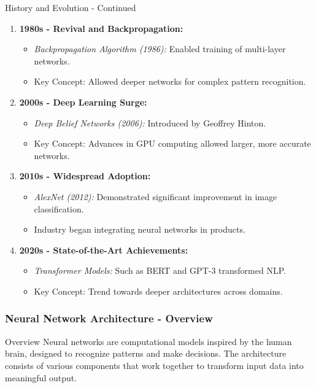 \documentclass[aspectratio=169]{beamer}
\begin{document}
\begin{frame}[fragile]{History and Evolution - Continued}
    \begin{enumerate}[resume]
        \item \textbf{1980s - Revival and Backpropagation:}
            \begin{itemize}
                \item \textit{Backpropagation Algorithm (1986):} Enabled training of multi-layer networks.
                \item Key Concept: Allowed deeper networks for complex pattern recognition.
            \end{itemize}
        
        \item \textbf{2000s - Deep Learning Surge:}
            \begin{itemize}
                \item \textit{Deep Belief Networks (2006):} Introduced by Geoffrey Hinton.
                \item Key Concept: Advances in GPU computing allowed larger, more accurate networks.
            \end{itemize}
        
        \item \textbf{2010s - Widespread Adoption:}
            \begin{itemize}
                \item \textit{AlexNet (2012):} Demonstrated significant improvement in image classification.
                \item Industry began integrating neural networks in products.
            \end{itemize}

        \item \textbf{2020s - State-of-the-Art Achievements:}
            \begin{itemize}
                \item \textit{Transformer Models:} Such as BERT and GPT-3 transformed NLP.
                \item Key Concept: Trend towards deeper architectures across domains.
            \end{itemize}
    \end{enumerate}
\end{frame}

\begin{frame}[fragile]
    \frametitle{Neural Network Architecture - Overview}
    \begin{block}{Overview}
        Neural networks are computational models inspired by the human brain, designed to recognize patterns and make decisions. The architecture consists of various components that work together to transform input data into meaningful output.
    \end{block}
\end{frame}
\end{document}
